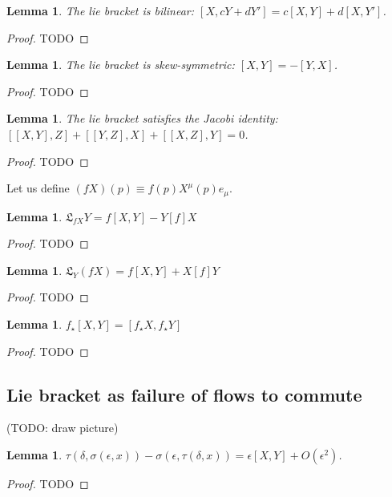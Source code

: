 \documentclass[11pt]{book}
\newcommand{\Lie}{\ensuremath{\mathfrak{L}}}
\newcommand{\pushforward}[1]{\ensuremath{{#1}_{\star}}}
\newtheorem{lemma}[theorem]{Lemma}
\newtheorem{proof}[theorem]{Proof}
\begin{document}
\begin{lemma}
The lie bracket is bilinear: $[X, cY + dY'] = c[X, Y] + d[X, Y']$.
\end{lemma}
\begin{proof}
TODO
\end{proof}

\begin{lemma}
The lie bracket is skew-symmetric: $[X, Y] = -[Y, X]$.
\end{lemma}
\begin{proof}
TODO
\end{proof}

\begin{lemma}
The lie bracket satisfies the Jacobi identity: $[[X, Y], Z] + [[Y, Z], X] + [[X, Z], Y] = 0$.
\end{lemma}
\begin{proof}
TODO
\end{proof}

Let us define $(fX)(p) \equiv f(p) X^\mu(p) e_\mu$.

\begin{lemma}
$\Lie_{fX}Y = f[X, Y] - Y[f]X$
\end{lemma}
\begin{proof}
TODO
\end{proof}

\begin{lemma}
$\Lie_{Y} (fX) = f[X, Y] + X[f]Y$
\end{lemma}
\begin{proof}
TODO
\end{proof}

\begin{lemma}
$\pushforward f[X, Y] = [\pushforward f X, \pushforward f Y]$
\end{lemma}
\begin{proof}
TODO
\end{proof}

\subsection{Lie bracket as failure of flows to commute}

(TODO: draw picture)

\begin{lemma}
 $\tau(\delta, \sigma(\epsilon, x)) - \sigma(\epsilon, \tau(\delta, x)) = \epsilon [X, Y] + O(\epsilon ^2)$.
\end{lemma}
\begin{proof}
TODO
\end{proof}
\end{document}

